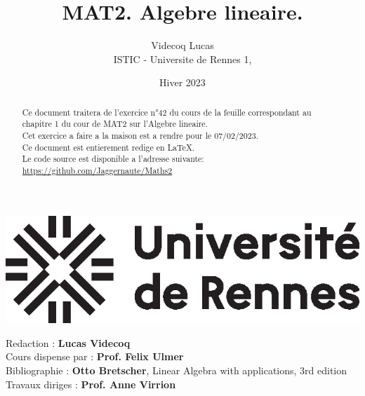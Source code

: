 \documentclass{config/homework}
\title{\fontfamily{phv}\selectfont MAT2. Algebre lineaire.}
\author{Videcoq Lucas \\ ISTIC - Universite de Rennes 1, \textit{\thedate}}
\date{Hiver 2023}
\begin{document}
    \begin{titlepage}

        \maketitle

        \begin{abstract}
            Ce document traitera de l'exercice n°42 du cours de la feuille correspondant
            au chapitre 1 du cour de MAT2 sur l'Algebre lineaire. \\
            Cet exercice a faire a la maison est a rendre pour le 07/02/2023.\\
            Ce document est entierement redige en LaTeX. \\
            Le code source est disponible a l'adresse suivante: \url{https://github.com/Jaggernaute/Maths2}
        \end{abstract}
        \vspace{5em}
        \center\includegraphics{images/univ-logo}

        \newpage

        \tableofcontents

        \vspace{5em}

        \begin{contributors}
            \vspace{.25em}
            Redaction : \textbf{Lucas Videcoq} \\
            Cours dispense par : \textbf{Prof. Felix Ulmer} \\
            Bibliographie : \textbf{Otto Bretscher}, Linear Algebra with applications,
            3rd edition \\
            Travaux diriges : \textbf{Prof. Anne Virrion} \\
            \vspace{.25em}
        \end{contributors}

    \end{titlepage}
\end{document}
